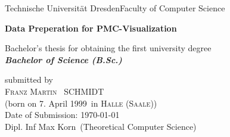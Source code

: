 \documentclass[a4paper,12pt,leqno]{article}
\newcommand{\name}{Schmidt}
\newcommand{\vorname}{Franz Martin}
\newcommand{\gebdatum}{7. April 1999}
\newcommand{\ort}{Halle (Saale)}
\newcommand{\betreuer}{Dipl. Inf Max Korn}
\newcommand{\institut}{Theoretical Computer Science}
\newcommand{\thema}{Data Preperation for PMC-Visualization}
\newcommand{\datum}{\today} %
\begin{document}


\thispagestyle{empty}

\begin{center}
{\Large Technische Universit\"{a}t Dresden\hspace{2pt}\textbullet\hspace{4pt}Faculty of Computer Science}

\vfil

{\bfseries\Huge\thema}

\vfil
{\LARGE
Bachelor's thesis for obtaining the first university degree \\[\bigskipamount]
\bfseries{\itshape Bachelor of Science (B.Sc.)}\\[\bigskipamount]
}

\vfil\vfil

\vfil

submitted by
\\[\bigskipamount]
\textsc{\vorname\ } \MakeUppercase{\name}
\\[\bigskipamount]
(born on \gebdatum\ in \textsc{\ort})
\\[\bigskipamount]
Date of Submission: \datum
\\[\bigskipamount]
\betreuer\ (\institut)
\end{center}
%
%
%
%
%
%
\end{document}
